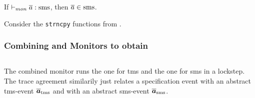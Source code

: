 \documentclass[utf8,acmsmall,review,screen,dvipsnames]{acmart}
\begin{document}


\begin{lemma}\label{lem:mon:smsafe}
  If $\monsmssafe{\trace}$, then $\trace\in\smssafe$.\Coqed
\end{lemma}

\begin{example}\label{ex:strncpy:sms}
  Consider the \texttt{strncpy} functions from .
\end{example}

\subsubsection{Combining  and  Monitors to obtain }\label{subsubsec:ms}

\begin{center}
  $\;$\\
\end{center}
The combined monitor runs the one for \gls{tms} and the one for \gls{sms} in a lockstep. The trace agreement similarily just relates a specification event with an abstract \gls{tms}-event $\abstrace[_{\tmssafe}]$ and with an abstract \gls{sms}-event $\abstrace[_{\smssafe}]$.
\end{document}
